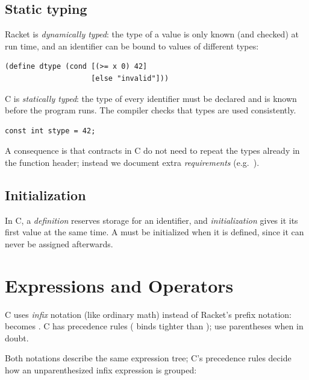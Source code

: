 \subsection{Static typing}

Racket is \emph{dynamically typed}: the type of a value is only known (and checked) at run time,
and an identifier can be bound to values of different types:
\begin{lstlisting}[style=racket]
(define dtype (cond [(>= x 0) 42]
                    [else "invalid"]))
\end{lstlisting}
C is \emph{statically typed}: the type of every identifier must be declared and is known before
the program runs. The compiler checks that types are used consistently.
\begin{lstlisting}[style=c]
const int stype = 42;
\end{lstlisting}
A consequence is that contracts in C do not need to repeat the types already in the function
header; instead we document extra \emph{requirements} (e.g.\ ).

\subsection{Initialization}

In C, a \emph{definition} reserves storage for an identifier, and \emph{initialization}
gives it its first value at the same time. A  must be initialized when it is
defined, since it can never be assigned afterwards.

\section{Expressions and Operators}

C uses \emph{infix} notation (like ordinary math) instead of Racket's prefix notation:
 becomes . C has precedence rules (\code{*} binds tighter
than \code{+}); use parentheses when in doubt.

Both notations describe the same expression tree; C's precedence rules decide
how an unparenthesized infix expression is grouped:

\begin{center}
\end{center}

